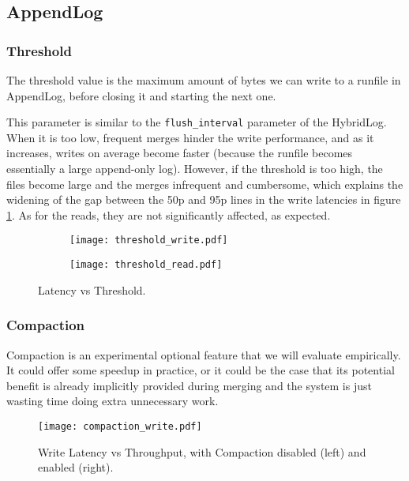 \subsection{AppendLog}

\subsubsection{Threshold}

The threshold value is the maximum amount of bytes we can write to a runfile in AppendLog, before closing it and starting the next one.

This parameter is similar to the \verb"flush_interval" parameter of the HybridLog. When it is too low, frequent merges hinder the write performance, and as it increases, writes on average become faster (because the runfile becomes essentially a large append-only log). However, if the threshold is too high, the files become large and the merges infrequent and cumbersome, which explains the widening of the gap between the 50p and 95p lines in the write latencies in figure \ref{fig:threshold_write_read}. As for the reads, they are not significantly affected, as expected.

\begin{figure}[h]
    \begin{subfigure}{.5\textwidth}
        \centering
        \texttt{[image: threshold\_write.pdf]}
    \end{subfigure}
    \begin{subfigure}{.5\textwidth}
        \centering
        \texttt{[image: threshold\_read.pdf]}
    \end{subfigure}
    \caption{Latency vs Threshold.}
    \label{fig:threshold_write_read}
\end{figure}

\subsubsection{Compaction}

Compaction is an experimental optional feature that we will evaluate empirically. It could offer some speedup in practice, or it could be the case that its potential benefit is already implicitly provided during merging and the system is just wasting time doing extra unnecessary work.

\begin{figure}[h]
    \centering
    \texttt{[image: compaction\_write.pdf]}
    \caption{Write Latency vs Throughput, with Compaction disabled (left) and enabled (right).}
    \label{fig:compaction-write}
\end{figure}

